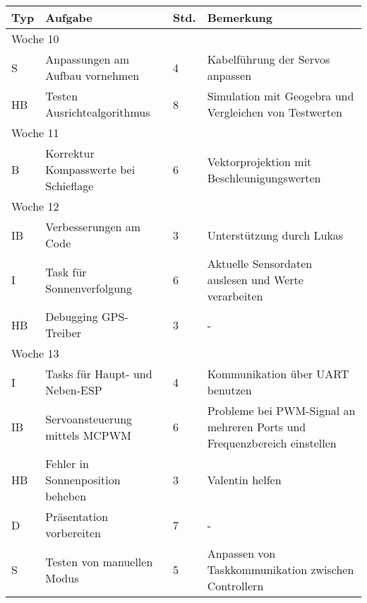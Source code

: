 \vspace{1em}
\begin{table}[!hp]
\begin{center}
    \begin{tabular}{|l|p{4.5cm}|p{1cm}|p{9cm}|} \hline
        \textbf{Typ} & \textbf{Aufgabe} & \textbf{Std.} & \textbf{Bemerkung} \\ \hline
        \multicolumn{4}{|l|}{Woche 10}                                                                      \\ \hline
        S           & Anpassungen am Aufbau vornehmen & 4 & Kabelführung der Servos anpassen                           \\ \hline
        HB          & Testen Ausrichtealgorithmus & 8 & Simulation mit Geogebra und Vergleichen von Testwerten \\ \hline
        \multicolumn{4}{|l|}{Woche 11}                                                                      \\ \hline
        B           & Korrektur Kompasswerte bei Schieflage & 6 & Vektorprojektion mit Beschleunigungswerten\\ \hline
        \multicolumn{4}{|l|}{Woche 12}                                                                      \\ \hline
        IB           & Verbesserungen am Code & 3 & Unterstützung durch Lukas                                                 \\ \hline
        I           & Task für Sonnenverfolgung & 6 & Aktuelle Sensordaten auslesen und Werte verarbeiten \\ \hline
        HB          & Debugging GPS-Treiber & 3 & - \\ \hline
        \multicolumn{4}{|l|}{Woche 13}                                                                      \\ \hline
        I           & Tasks für Haupt- und Neben-ESP & 4 & Kommunikation über UART benutzen       \\ \hline
        IB          & Servoansteuerung mittels MCPWM & 6 & Probleme bei PWM-Signal an mehreren Ports und Frequenzbereich einstellen\\ \hline
        HB          & Fehler in Sonnenposition beheben & 3 & Valentin helfen                                \\ \hline
        D           & Präsentation vorbereiten & 7 & -                                                      \\ \hline
        S           & Testen von manuellen Modus & 5 & Anpassen von Taskkommunikation zwischen  Controllern        \\ \hline

\end{tabular}
\end{center}
\end{table}
